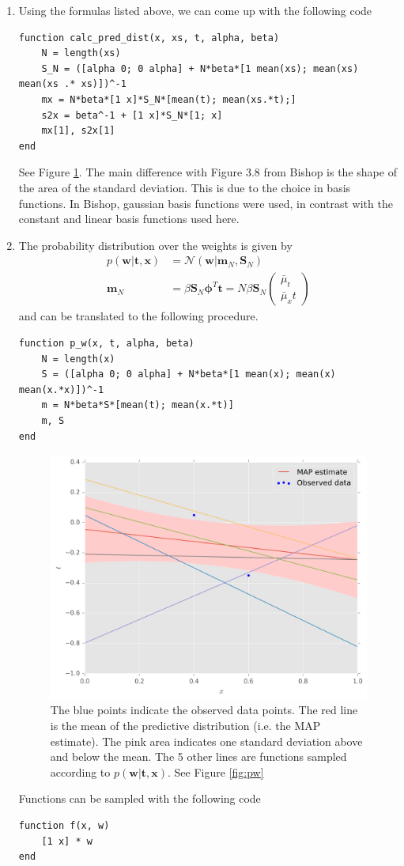 \documentclass{article}
\begin{document}
\begin{enumerate}
\item Using the formulas listed above, we can come up with the following code
\begin{lstlisting}
function calc_pred_dist(x, xs, t, alpha, beta)
    N = length(xs)
    S_N = ([alpha 0; 0 alpha] + N*beta*[1 mean(xs); mean(xs) mean(xs .* xs)])^-1
    mx = N*beta*[1 x]*S_N*[mean(t); mean(xs.*t);]
    s2x = beta^-1 + [1 x]*S_N*[1; x]
    mx[1], s2x[1]
end
\end{lstlisting}
See Figure \ref{fig:blr}. The main difference with Figure 3.8 from Bishop is the shape of the area of the standard deviation. This is due to the choice in basis functions. In Bishop, gaussian basis functions were used, in contrast with the constant and linear basis functions used here.

\item The probability distribution over the weights is given by
\begin{align*}
p(\bm{w}|\bm{t}, \bm{x}) &= \mathcal{N}(\bm{w}|\bm{m}_N, \bm{S}_N) \\
\bm{m}_N &= \beta\bm{S}_N\bm{\phi}^T\bm{t}=N\beta\bm{S}_N\begin{pmatrix}\bar{\mu}_t \\ \bar{\mu}_xt\end{pmatrix}
\end{align*}
and can be translated to the following procedure.
\begin{lstlisting}
function p_w(x, t, alpha, beta)
    N = length(x)
    S = ([alpha 0; 0 alpha] + N*beta*[1 mean(x); mean(x) mean(x.*x)])^-1
    m = N*beta*S*[mean(t); mean(x.*t)]
    m, S
end
\end{lstlisting}
\begin{figure}[H]
\centering
\includegraphics[width=.6\linewidth]{images/blr.png}
\caption{The blue points indicate the observed data points. The red line is the mean of the predictive distribution (i.e. the MAP estimate). The pink area indicates one standard deviation above and below the mean. The 5 other lines are functions sampled according to $p(\bm{w}|\bm{t}, \bm{x})$. See Figure \ref{fig:pw}}
\label{fig:blr}
\end{figure}
Functions can be sampled with the following code
\begin{lstlisting}
function f(x, w)
    [1 x] * w
end


\end{lstlisting}
\end{enumerate}
\end{document}
